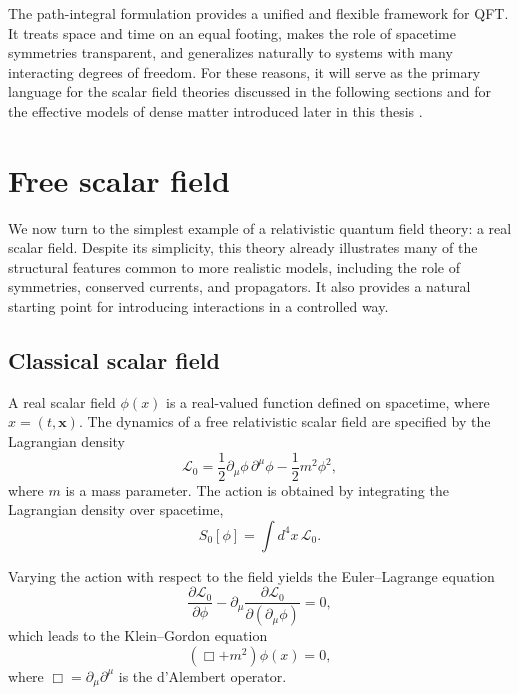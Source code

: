 The path-integral formulation provides a unified and flexible framework for
QFT. It treats space and time on an equal footing, makes the
role of spacetime symmetries transparent, and generalizes naturally to systems with many
interacting degrees of freedom. For these reasons, it will serve as the primary
language for the scalar field theories discussed in the following sections and
for the effective models of dense matter introduced later in this thesis
\cite{PeskinSchroeder1995,Weinberg1995}.

\section{Free scalar field}
\label{sec:free_scalar_field}

We now turn to the simplest example of a relativistic quantum field theory: a
real scalar field. Despite its simplicity, this theory already illustrates
many of the structural features common to more realistic models, including the
role of symmetries, conserved currents, and propagators. It also provides a
natural starting point for introducing interactions in a controlled way.

\subsection*{Classical scalar field}

A real scalar field $\phi(x)$ is a real-valued function defined on spacetime,
where $x=(t,\mathbf{x})$. The dynamics of a free relativistic scalar field are
specified by the Lagrangian density
\begin{equation}
\mathcal{L}_0
= \frac{1}{2}\partial_\mu \phi\, \partial^\mu \phi
- \frac{1}{2} m^2 \phi^2 ,
\end{equation}
where $m$ is a mass parameter. The action
is obtained by integrating the Lagrangian density over spacetime,
\begin{equation}
S_0[\phi] = \int d^4x \, \mathcal{L}_0 .
\end{equation}

Varying the action with respect to the field yields the Euler--Lagrange equation
\begin{equation}
\frac{\partial \mathcal{L}_0}{\partial \phi}
- \partial_\mu
\frac{\partial \mathcal{L}_0}{\partial(\partial_\mu\phi)} = 0 ,
\end{equation}
which leads to the Klein--Gordon equation
\begin{equation}
(\Box + m^2)\phi(x) = 0 ,
\end{equation}
where $\Box = \partial_\mu\partial^\mu$ is the d'Alembert operator.

